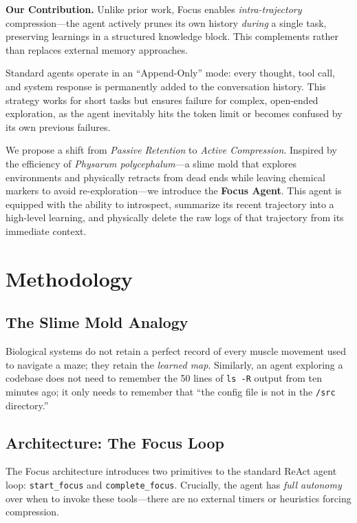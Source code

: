 \documentclass[conference]{IEEEtran}
\begin{document}
\textbf{Our Contribution.} Unlike prior work, Focus enables \textit{intra-trajectory} compression---the agent actively prunes its own history \textit{during} a single task, preserving learnings in a structured knowledge block. This complements rather than replaces external memory approaches.

Standard agents operate in an ``Append-Only'' mode: every thought, tool call, and system response is permanently added to the conversation history. This strategy works for short tasks but ensures failure for complex, open-ended exploration, as the agent inevitably hits the token limit or becomes confused by its own previous failures.

We propose a shift from \textit{Passive Retention} to \textit{Active Compression}. Inspired by the efficiency of \textit{Physarum polycephalum}---a slime mold that explores environments and physically retracts from dead ends while leaving chemical markers to avoid re-exploration---we introduce the \textbf{Focus Agent}. This agent is equipped with the ability to introspect, summarize its recent trajectory into a high-level learning, and physically delete the raw logs of that trajectory from its immediate context.

\section{Methodology}

\subsection{The Slime Mold Analogy}
Biological systems do not retain a perfect record of every muscle movement used to navigate a maze; they retain the \textit{learned map}. Similarly, an agent exploring a codebase does not need to remember the 50 lines of \texttt{ls -R} output from ten minutes ago; it only needs to remember that ``the config file is not in the \texttt{/src} directory.''

\subsection{Architecture: The Focus Loop}
The Focus architecture introduces two primitives to the standard ReAct agent loop: \texttt{start\_focus} and \texttt{complete\_focus}. Crucially, the agent has \textit{full autonomy} over when to invoke these tools---there are no external timers or heuristics forcing compression.
\end{document}
